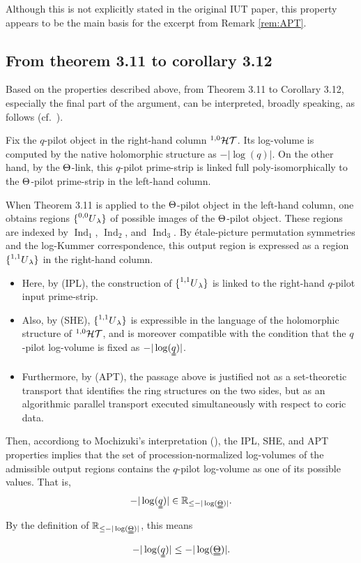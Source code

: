 \documentclass[12pt, reqno, a4paper]{amsart}
\def\bR{\mathbb{R}} %
\DeclareMathOperator{\Ind}{Ind}
\def\IndOne{\Ind_1}
\def\IndTwo{\Ind_2}
\def\IndThree{\Ind_3}
\begin{document}
\medskip
Although this is not explicitly stated in the original IUT paper, this property appears to be the main basis for the excerpt from Remark \ref{rem:APT}.



\subsection{From theorem 3.11 to corollary 3.12}\label{sub:fromThm311toCor312Precise}
Based on the properties described above, from Theorem 3.11 to Corollary 3.12, especially the final part of the argument, can be interpreted, broadly speaking, as follows (cf.\ \cite[Proof of Cor.\ 3.12, Step (xi), pp.\ 606ff]{MR4225475}).

\medskip
Fix the \(q\)-pilot object in the right-hand column \(\HT[1,0]\).
Its log-volume is computed by the native holomorphic structure as \(-|\log(q)|\).
On the other hand, by the \(\Th\)-link, this \(q\)-pilot prime-strip is linked full poly-isomorphically to the \(\Th\)-pilot prime-strip in the left-hand column.

When Theorem 3.11 is applied to the \(\Th\)-pilot object in the left-hand column, one obtains regions \(\{\prescript{0,0}{}U_{\lambda}\}\) of possible images of the \(\Th\)-pilot object.
These regions are indexed by \(\IndOne\), \(\IndTwo\), and \(\IndThree\).
By \'etale-picture permutation symmetries and the log-Kummer correspondence, this output region is expressed as a region \(\{\prescript{1,1}{}U_{\lambda}\}\) in the right-hand column.

\begin{itemize}
\item Here, by (IPL), the construction of \(\{\prescript{1,1}{}U_{\lambda}\}\) is linked to the right-hand \(q\)-pilot input prime-strip.
\item Also, by (SHE), \(\{\prescript{1,1}{}U_{\lambda}\}\) is expressible in the language of the holomorphic structure of \(\HT[1,0]\), and is moreover compatible with the condition that the \(q\)-pilot log-volume is fixed as \(-|\log(\uuqq)|\).
\item Furthermore, by (APT), the passage above is justified not as a set-theoretic transport that identifies the ring structures on the two sides, but as an algorithmic parallel transport executed simultaneously with respect to coric data.
\end{itemize}

Then, accordiong to Mochizuki's interpretation (\cite[Step (xi) of the proof of Cor.\ 3.12]{MR4225475}), the IPL, SHE, and APT properties implies that the set of procession-normalized log-volumes of the admissible output regions contains the $q$-pilot log-volume as one of its possible values.
That is,
\[
  -|\log(\uuqq)|\in \bR_{\leq -|\log(\uuTh)|}.
\]
By the definition of \(\bR_{\leq -|\log(\uuTh)|}\), this means
\[
  -|\log(\uuqq)|\leq -|\log(\uuTh)|.
\]
\end{document}
